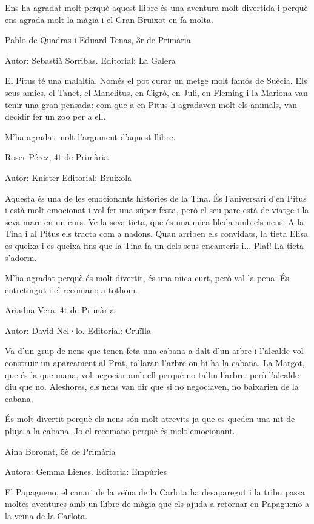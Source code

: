 \begin{shortnews}
{Ens ha agradat molt perquè aquest llibre és una aventura molt divertida i perquè ens agrada molt la màgia i el Gran Bruixot en fa molta.

 Pablo de Quadras i Eduard Tenas,  3r de Primària
}


{
Autor: 	Sebastià Sorribas.  Editorial: La Galera


El Pitus té una malaltia. Només el pot curar un metge molt famós de Suècia. Els seus amics, el Tanet, el Manelitus, en Cigró, en Juli, en Fleming i la Mariona van tenir una gran pensada: com que a en Pitus li agradaven molt els animals, van decidir fer un zoo per a ell.

M’ha agradat molt l’argument d’aquest  llibre.

Roser Pérez, 4t de Primària
}

{
Autor: Knister   Editorial: Bruixola


Aquesta és una de les emocionants històries de la Tina. És l’aniversari d’en Pitus i està molt emocionat i vol fer una súper festa, però el seu pare està de viatge i la seva mare en un curs. Ve la seva tieta, que és una mica bleda  amb els nens. A la Tina i al Pitus els tracta com a nadons. Quan arriben els convidats, la tieta Elisa es queixa i es queixa fins que la Tina fa un dels seus encanteris i... Plaf! La tieta s’adorm.

M’ha agradat perquè és molt divertit, és una mica curt, però val la pena. És entretingut i el recomano a tothom.

Ariadna Vera, 4t de Primària
}

{
Autor: David Nel·lo.   Editorial: Cruïlla

Va d’un grup de nens que tenen feta una cabana a dalt d’un arbre i l’alcalde vol construir un aparcament al Prat, tallaran l’arbre on hi ha la cabana. La Margot, que és la que mana, vol negociar amb ell perquè no tallin l’arbre, però l’alcalde diu que no. Aleshores, els nens van dir que si no negociaven, no baixarien de la cabana. 

És molt divertit perquè els nens són molt atrevits ja que es queden una nit de pluja a la cabana. Jo el recomano perquè és molt emocionant.

Aina Boronat, 5è de Primària
}

{
Autora: Gemma Lienes.    Editoria: Empúries

El Papagueno, el canari de la veïna de la Carlota ha desaparegut i la tribu passa moltes aventures amb un llibre de màgia que els ajuda a retornar en Papagueno a la veïna de la Carlota.  

}
\end{shortnews}
